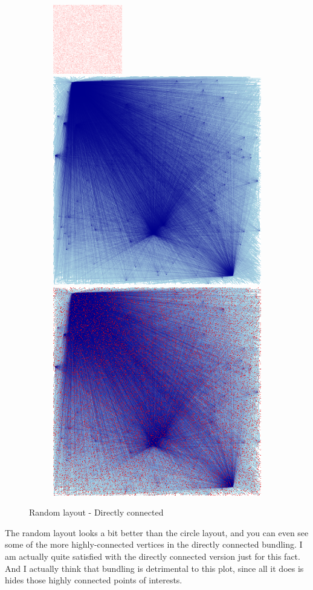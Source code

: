 \documentclass[12pt, a4paper]{article}
\begin{document}
\begin{figure}[H]
    \centering
    \begin{subfigure}[b]{\textwidth}
        \centering
        \includegraphics[width=0.33\textwidth]{src/youtube/datashader/simple/datashader/6_1}%
        \hfill
        \includegraphics[width=0.33\columnwidth]{src/youtube/datashader/simple/datashader/6_2}%
        \hfill
        \includegraphics[width=0.33\columnwidth]{src/youtube/datashader/simple/datashader/6_3}
    \end{subfigure}
    \caption{Random layout - Directly connected}
    \label{fig:ds_show_6}
\end{figure}


The random layout looks a bit better than the circle layout, and you can even see some of the more highly-connected vertices in the directly connected bundling. I am actually quite satisfied with the directly connected version just for this fact. And I actually think that bundling is detrimental to this plot, since all it does is hides those highly connected points of interests.
\end{document}
